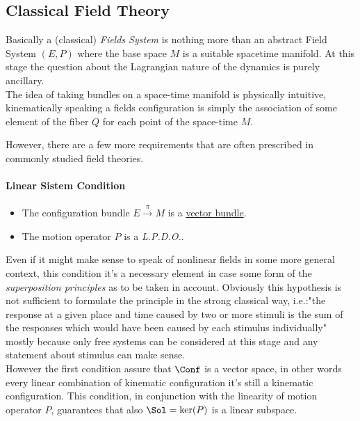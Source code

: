 \documentclass[Main]{subfiles}
\begin{document}
	
	
		\subsection{Classical Field Theory}
		Basically a (classical) \emph{Fields System} is nothing more than an abstract Field System $(E,P)$ where the base space $M$  is a suitable spacetime manifold\cite{Bar}. At this stage the question about the Lagrangian nature of the dynamics is purely ancillary.
		\\		
		The idea of taking bundles on a space-time manifold is physically intuitive, kinematically speaking a fields configuration is simply the association of some element of the fiber $Q $ for each point of the space-time $M$.
		
		However, there are a few more requirements that are often prescribed in commonly studied field theories.
		\paragraph{Linear Sistem Condition}		
			\begin{itemize}
				 \item The configuration bundle $E\xrightarrow{\pi} M$ is a \underline{vector bundle}.
				 \item The motion operator $P$ is a \emph{L.P.D.O.}.
			\end{itemize}
			Even if it might make sense to speak of nonlinear fields in some more general context, this condition it's a necessary element in case some form of the \emph{superposition principles} as to be taken in account.
			Obviously this hypothesis is not sufficient to formulate the principle in the strong classical way, i.e.:"the response at a given place and time caused by two or more stimuli is the sum of the responses which would have been caused by each stimulus individually" mostly because only free systems can be considered at this stage and any statement about stimulus can make sense.
			\\
			However the first condition assure that $\Conf$ is a vector space, in other words every linear combination of kinematic configuration it's still a kinematic configuration.
			This condition, in conjunction with the linearity of motion operator $P$,  guarantees that also $\Sol= \ker(P)$ is a linear subspace.		
			 
\end{document}
